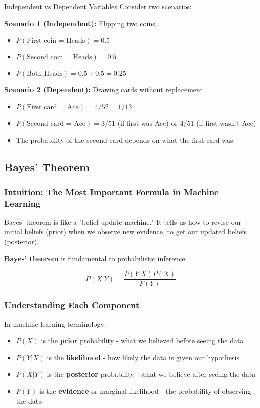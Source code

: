 \begin{examplebox}{Independent vs Dependent Variables}
Consider two scenarios:

\textbf{Scenario 1 (Independent):} Flipping two coins
\begin{itemize}
    \item $P(\text{First coin = Heads}) = 0.5$
    \item $P(\text{Second coin = Heads}) = 0.5$
    \item $P(\text{Both Heads}) = 0.5 \times 0.5 = 0.25$ \checkmark
\end{itemize}

\textbf{Scenario 2 (Dependent):} Drawing cards without replacement
\begin{itemize}
    \item $P(\text{First card = Ace}) = 4/52 = 1/13$
    \item $P(\text{Second card = Ace}) = 3/51$ (if first was Ace) or $4/51$ (if first wasn't Ace)
    \item The probability of the second card depends on what the first card was
\end{itemize}
\end{examplebox}

\subsection{Bayes' Theorem}

\subsubsection{Intuition: The Most Important Formula in Machine Learning}

Bayes' theorem is like a "belief update machine." It tells us how to revise our initial beliefs (prior) when we observe new evidence, to get our updated beliefs (posterior).

\textbf{Bayes' theorem} is fundamental to probabilistic inference:

\begin{equation}
P(X|Y) = \frac{P(Y|X)P(X)}{P(Y)}
\end{equation}

\subsubsection{Understanding Each Component}

In machine learning terminology:
\begin{itemize}
    \item $P(X)$ is the \textbf{prior} probability - what we believed before seeing the data
    \item $P(Y|X)$ is the \textbf{likelihood} - how likely the data is given our hypothesis
    \item $P(X|Y)$ is the \textbf{posterior} probability - what we believe after seeing the data
    \item $P(Y)$ is the \textbf{evidence} or marginal likelihood - the probability of observing the data
\end{itemize}


